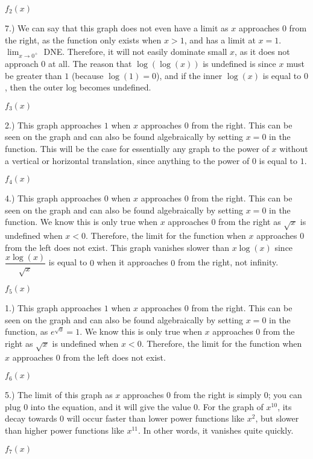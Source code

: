 \documentclass[answers,addpoints]{exam}
\begin{document}
\begin{questions}
\begin{solution}
    \textbf{$f_2(x)$}

  7.) We can say that this graph does not even have a limit as $x$ approaches $0$ from the right, as the function only exists when $x>1$, and has a limit at $x=1$. $\lim_{x \to 0^+}$ DNE. Therefore, it will not easily dominate small $x$, as it does not approach $0$ at all. The reason that $\log(\log(x))$ is undefined is since $x$ must be greater than $1$ (because $\log(1)=0$), and if the inner $\log(x)$ is equal to $0$, then the outer log becomes undefined.

  \textbf{$f_3(x)$}

2.) This graph approaches $1$ when $x$ approaches $0$ from the right. This can be seen on the graph and can also be found algebraically by setting $x=0$ in the function. This will be the case for essentially any graph to the power of $x$ without a vertical or horizontal translation, since anything to the power of $0$ is equal to $1$.

\textbf{$f_4(x)$}

4.) This graph approaches $0$ when $x$ approaches $0$ from the right. This can be seen on the graph and can also be found algebraically by setting $x=0$ in the function. We know this is only true when $x$ approaches $0$ from the right as $\sqrt{x}$ is undefined when $x<0$. Therefore, the limit for the function when $x$ approaches $0$ from the left does not exist. This graph vanishes slower than $x\log(x)$ since $\dfrac{x\log(x)}{\sqrt{x}}$ is equal to $0$ when it approaches $0$ from the right, not infinity.

\textbf{$f_5(x)$}

1.) This graph approaches $1$ when $x$ approaches $0$ from the right. This can be seen on the graph and can also be found algebraically by setting $x=0$ in the function, as $e^{\sqrt{0}}=1$. We know this is only true when $x$ approaches $0$ from the right as $\sqrt{x}$ is undefined when $x<0$. Therefore, the limit for the function when $x$ approaches $0$ from the left does not exist.

\textbf{$f_6(x)$}

5.) The limit of this graph as $x$ approaches $0$ from the right is simply $0$; you can plug $0$ into the equation, and it will give the value $0$. For the graph of $x^{10}$, its decay towards $0$ will occur faster than lower power functions like $x^2$, but slower than higher power functions like $x^{11}$. In other words, it vanishes quite quickly.

\textbf{$f_7(x)$}


\end{solution}
\end{questions}
\end{document}

